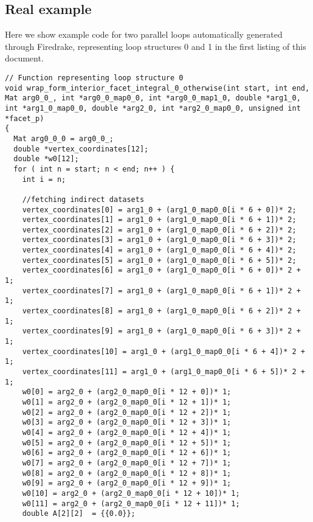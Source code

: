 \documentclass[a4paper]{article}
\begin{document}
\clearpage

\begin{appendices}
\section{Real example}
Here we show example code for two parallel loops automatically generated through Firedrake, representing loop structures 0 and 1 in the first listing of this document.

\scriptsize
\begin{lstlisting}
// Function representing loop structure 0
void wrap_form_interior_facet_integral_0_otherwise(int start, int end, Mat arg0_0_, int *arg0_0_map0_0, int *arg0_0_map1_0, double *arg1_0, int *arg1_0_map0_0, double *arg2_0, int *arg2_0_map0_0, unsigned int *facet_p) 
{
  Mat arg0_0_0 = arg0_0_;
  double *vertex_coordinates[12];
  double *w0[12];
  for ( int n = start; n < end; n++ ) {
    int i = n;
    
    //fetching indirect datasets
    vertex_coordinates[0] = arg1_0 + (arg1_0_map0_0[i * 6 + 0])* 2;
    vertex_coordinates[1] = arg1_0 + (arg1_0_map0_0[i * 6 + 1])* 2;
    vertex_coordinates[2] = arg1_0 + (arg1_0_map0_0[i * 6 + 2])* 2;
    vertex_coordinates[3] = arg1_0 + (arg1_0_map0_0[i * 6 + 3])* 2;
    vertex_coordinates[4] = arg1_0 + (arg1_0_map0_0[i * 6 + 4])* 2;
    vertex_coordinates[5] = arg1_0 + (arg1_0_map0_0[i * 6 + 5])* 2;
    vertex_coordinates[6] = arg1_0 + (arg1_0_map0_0[i * 6 + 0])* 2 + 1;
    vertex_coordinates[7] = arg1_0 + (arg1_0_map0_0[i * 6 + 1])* 2 + 1;
    vertex_coordinates[8] = arg1_0 + (arg1_0_map0_0[i * 6 + 2])* 2 + 1;
    vertex_coordinates[9] = arg1_0 + (arg1_0_map0_0[i * 6 + 3])* 2 + 1;
    vertex_coordinates[10] = arg1_0 + (arg1_0_map0_0[i * 6 + 4])* 2 + 1;
    vertex_coordinates[11] = arg1_0 + (arg1_0_map0_0[i * 6 + 5])* 2 + 1;
    w0[0] = arg2_0 + (arg2_0_map0_0[i * 12 + 0])* 1;
    w0[1] = arg2_0 + (arg2_0_map0_0[i * 12 + 1])* 1;
    w0[2] = arg2_0 + (arg2_0_map0_0[i * 12 + 2])* 1;
    w0[3] = arg2_0 + (arg2_0_map0_0[i * 12 + 3])* 1;
    w0[4] = arg2_0 + (arg2_0_map0_0[i * 12 + 4])* 1;
    w0[5] = arg2_0 + (arg2_0_map0_0[i * 12 + 5])* 1;
    w0[6] = arg2_0 + (arg2_0_map0_0[i * 12 + 6])* 1;
    w0[7] = arg2_0 + (arg2_0_map0_0[i * 12 + 7])* 1;
    w0[8] = arg2_0 + (arg2_0_map0_0[i * 12 + 8])* 1;
    w0[9] = arg2_0 + (arg2_0_map0_0[i * 12 + 9])* 1;
    w0[10] = arg2_0 + (arg2_0_map0_0[i * 12 + 10])* 1;
    w0[11] = arg2_0 + (arg2_0_map0_0[i * 12 + 11])* 1;
    double A[2][2]  = {{0.0}};


\end{lstlisting}
\end{appendices}
\end{document}
